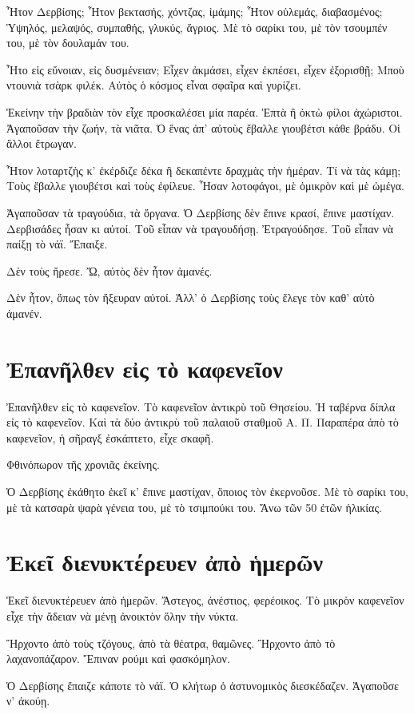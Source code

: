 \documentclass[11pt]{article}
\begin{document}
Ἦτον Δερβίσης; Ἦτον βεκτασής, χόντζας, ἰμάμης; Ἦτον οὐλεμάς, διαβασμένος; Ὑψηλός, μελαψός, συμπαθής, γλυκύς, ἄγριος. Μὲ τὸ σαρίκι του, μὲ τὸν τσουμπέν του, μὲ τὸν δουλαμάν του.

Ἦτο εἰς εὔνοιαν, εἰς δυσμένειαν; Εἶχεν ἀκμάσει, εἶχεν ἐκπέσει, εἶχεν ἐξορισθῇ; Μποὺ ντουνιὰ τσὰρκ φιλέκ. Αὐτὸς ὁ κόσμος εἶναι σφαῖρα καὶ γυρίζει.

Ἐκείνην τὴν βραδιὰν τὸν εἶχε προσκαλέσει μία παρέα. Ἑπτὰ ἢ ὀκτὼ φίλοι ἀχώριστοι. Ἀγαποῦσαν τὴν ζωήν, τὰ νιᾶτα. Ὁ ἕνας ἀπ' αὐτοὺς ἔβαλλε γιουβέτσι κάθε βράδυ. Οἱ ἄλλοι ἔτρωγαν.

Ἦτον λοταρτζὴς κ' ἐκέρδιζε δέκα ἢ δεκαπέντε δραχμὰς τὴν ἡμέραν. Τί νὰ τὰς κάμῃ; Τοὺς ἔβαλλε γιουβέτσι καὶ τοὺς ἐφίλευε. Ἦσαν λοτοφάγοι, μὲ ὀμικρὸν καὶ μὲ ὠμέγα.

Ἀγαποῦσαν τὰ τραγούδια, τὰ ὄργανα. Ὁ Δερβίσης δὲν ἔπινε κρασί, ἔπινε μαστίχαν. Δερβισάδες ἦσαν κι αὐτοί. Τοῦ εἶπαν νὰ τραγουδήσῃ. Ἐτραγούδησε. Τοῦ εἶπαν νὰ παίξῃ τὸ νάϊ. Ἔπαιξε.

Δὲν τοὺς ἤρεσε. Ὤ, αὐτὸς δὲν ἦτον ἀμανές.

Δὲν ἦτον, ὅπως τὸν ἤξευραν αὐτοί. Ἀλλ' ὁ Δερβίσης τοὺς ἔλεγε τὸν καθ' αὑτὸ ἀμανέν.

\section{Ἐπανῆλθεν εἰς τὸ καφενεῖον}
\label{sec:org7453102}
Ἐπανῆλθεν εἰς τὸ καφενεῖον. Τὸ καφενεῖον ἀντικρὺ τοῦ Θησείου. Ἡ ταβέρνα δίπλα εἰς τὸ καφενεῖον. Καὶ τὰ δύο ἀντικρὺ τοῦ παλαιοῦ σταθμοῦ Α. Π. Παραπέρα ἀπὸ τὸ καφενεῖον, ἡ σῆραγξ ἐσκάπτετο, εἶχε σκαφῆ.

Φθινόπωρον τῆς χρονιᾶς ἐκείνης.

Ὁ Δερβίσης ἐκάθητο ἐκεῖ κ' ἔπινε μαστίχαν, ὅποιος τὸν ἐκερνοῦσε. Μὲ τὸ σαρίκι του, μὲ τὰ κατσαρὰ ψαρὰ γένεια του, μὲ τὸ τσιμπούκι του. Ἄνω τῶν 50 ἐτῶν ἡλικίας.

\section{Ἐκεῖ διενυκτέρευεν ἀπὸ ἡμερῶν}
\label{sec:orga66272d}
Ἐκεῖ διενυκτέρευεν ἀπὸ ἡμερῶν. Ἄστεγος, ἀνέστιος, φερέοικος. Τὸ μικρὸν καφενεῖον εἶχε τὴν ἄδειαν νὰ μένῃ ἀνοικτὸν ὅλην τὴν νύκτα.

Ἤρχοντο ἀπὸ τοὺς τζόγους, ἀπὸ τὰ θέατρα, θαμῶνες. Ἤρχοντο ἀπὸ τὸ λαχανοπάζαρον. Ἔπιναν ρούμι καὶ φασκόμηλον.

Ὁ Δερβίσης ἔπαιζε κάποτε τὸ νάϊ. Ὁ κλήτωρ ὁ ἀστυνομικὸς διεσκέδαζεν. Ἀγαποῦσε ν' ἀκούῃ.
\end{document}
